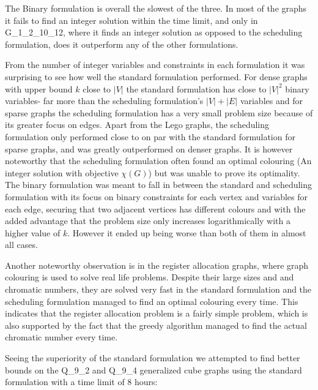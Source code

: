 \noindent The Binary formulation is overall the slowest of the three. In most of the graphs it fails to find an integer solution within the time limit, and only in G\_1\_2\_10\_12, where it finds an integer solution as opposed to the scheduling formulation, does it outperform any of the other formulations.

\noindent From the number of integer variables and constraints in each formulation it was surprising to see how well the standard formulation performed. For dense graphs with upper bound $k$ close to $|V|$ the standard formulation has close to $|V|^2$ binary variables- far more than the scheduling formulation's $|V|+|E|$ variables and for sparse graphs the scheduling formulation has a very small problem size because of its greater focus on edges. Apart from the Lego graphs, the scheduling formulation only performed close to on par with the standard formulation for sparse graphs, and was greatly outperformed on denser graphs. It is however noteworthy that the scheduling formulation often found an optimal colouring (An integer solution with objective $\chi (G)$) but was unable to prove its optimality. The binary formulation was meant to fall in between the standard and scheduling formulation with its focus on binary constraints for each vertex and variables for each edge, securing that two adjacent vertices has different colours and with the added advantage that the problem size only increases logarithmically with a higher value of $k$. However it ended up being worse than both of them in almost all cases.

\noindent Another noteworthy observation is in the register allocation graphs, where graph colouring is used to solve real life problems. Despite their large sizes and and chromatic numbers, they are solved very fast in the standard formulation and the scheduling formulation managed to find an optimal colouring every time. This indicates that the register allocation problem is a fairly simple problem, which is also supported by the fact that the greedy algorithm managed to find the actual chromatic number every time.

\noindent Seeing the superiority of the standard formulation we attempted to find better bounds on the Q\_9\_2 and Q\_9\_4 generalized cube graphs using the standard formulation with a time limit of 8 hours:
\iffalse
\todo{Standard - fast,
Scheduling - medium,
Binary - slow.
Maybe a bigger number of binary variables result in tighter relaxation}
\todo{(number of variables and constraints), the tightness of the formulation (the gap between integer optimal value and the optimal value of linear relaxation)}
\fi

